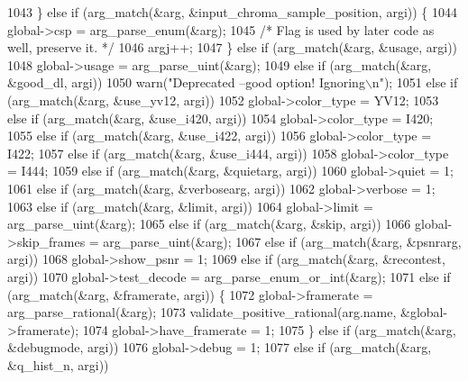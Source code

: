 \begin{DoxyCodeInclude}
{{{{{{{{{{{{{{1043     \} \textcolor{keywordflow}{else} \textcolor{keywordflow}{if} (arg\_match(&arg, &input\_chroma\_sample\_position, argi)) \{
1044       global->csp = arg\_parse\_enum(&arg);
1045       \textcolor{comment}{/* Flag is used by later code as well, preserve it. */}
1046       argj++;
1047     \} \textcolor{keywordflow}{else} \textcolor{keywordflow}{if} (arg\_match(&arg, &usage, argi))
1048       global->usage = arg\_parse\_uint(&arg);
1049     \textcolor{keywordflow}{else} \textcolor{keywordflow}{if} (arg\_match(&arg, &good\_dl, argi))
1050       warn(\textcolor{stringliteral}{"Deprecated --good option! Ignoring\(\backslash\)n"});
1051     \textcolor{keywordflow}{else} \textcolor{keywordflow}{if} (arg\_match(&arg, &use\_yv12, argi))
1052       global->color\_type = YV12;
1053     \textcolor{keywordflow}{else} \textcolor{keywordflow}{if} (arg\_match(&arg, &use\_i420, argi))
1054       global->color\_type = I420;
1055     \textcolor{keywordflow}{else} \textcolor{keywordflow}{if} (arg\_match(&arg, &use\_i422, argi))
1056       global->color\_type = I422;
1057     \textcolor{keywordflow}{else} \textcolor{keywordflow}{if} (arg\_match(&arg, &use\_i444, argi))
1058       global->color\_type = I444;
1059     \textcolor{keywordflow}{else} \textcolor{keywordflow}{if} (arg\_match(&arg, &quietarg, argi))
1060       global->quiet = 1;
1061     \textcolor{keywordflow}{else} \textcolor{keywordflow}{if} (arg\_match(&arg, &verbosearg, argi))
1062       global->verbose = 1;
1063     \textcolor{keywordflow}{else} \textcolor{keywordflow}{if} (arg\_match(&arg, &limit, argi))
1064       global->limit = arg\_parse\_uint(&arg);
1065     \textcolor{keywordflow}{else} \textcolor{keywordflow}{if} (arg\_match(&arg, &skip, argi))
1066       global->skip\_frames = arg\_parse\_uint(&arg);
1067     \textcolor{keywordflow}{else} \textcolor{keywordflow}{if} (arg\_match(&arg, &psnrarg, argi))
1068       global->show\_psnr = 1;
1069     \textcolor{keywordflow}{else} \textcolor{keywordflow}{if} (arg\_match(&arg, &recontest, argi))
1070       global->test\_decode = arg\_parse\_enum\_or\_int(&arg);
1071     \textcolor{keywordflow}{else} \textcolor{keywordflow}{if} (arg\_match(&arg, &framerate, argi)) \{
1072       global->framerate = arg\_parse\_rational(&arg);
1073       validate\_positive\_rational(arg.name, &global->framerate);
1074       global->have\_framerate = 1;
1075     \} \textcolor{keywordflow}{else} \textcolor{keywordflow}{if} (arg\_match(&arg, &debugmode, argi))
1076       global->debug = 1;
1077     \textcolor{keywordflow}{else} \textcolor{keywordflow}{if} (arg\_match(&arg, &q\_hist\_n, argi))
}}}}}}}}}}}}}}
\end{DoxyCodeInclude}
